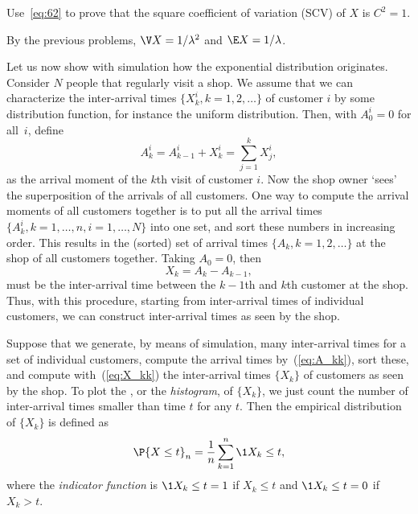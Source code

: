 \begin{exercise}
Use~\eqref{eq:62} to   prove that the square coefficient of variation (SCV) of $X$ is $C^2 =1$.  
\begin{solution}
  By the previous problems, $\V X = 1/\lambda^2$ and $\E X=1/\lambda$.
\end{solution}
\end{exercise}


Let us now show with simulation how the exponential distribution
originates. Consider $N$ people that regularly visit a shop. We assume
that we can characterize the inter-arrival times
$\{X_k^i, k=1,2, \ldots\}$ of customer $i$ by some distribution
function, for instance the uniform distribution. Then, with
$A_{0}^i=0$ for all~$i$, define 
\begin{equation}\label{eq:A_kk}
A_k^i = A_{k-1}^i + X_k^i = \sum_{j=1}^k X_j^i,
\end{equation}
as the arrival moment of the $k$th visit of customer $i$.  Now the
shop owner `sees' the superposition of the arrivals of all
customers. One way to compute the arrival moments of all customers
together is to put all the arrival times
$\{A_k^i, k=1,\ldots,n, i=1,\ldots,N\}$ into one set, and sort these
numbers in increasing order. This results in the (sorted) set of
arrival times $\{A_k, k=1,2,\ldots\}$ at the shop of all customers together. Taking $A_0=0$,  then
\begin{equation}\label{eq:X_kk}
X_k = A_k - A_{k-1},
\end{equation}
must be the inter-arrival time between the $k-1$th and
$k$th customer at the shop.  Thus, with this procedure, starting from inter-arrival times of
individual customers, we can construct inter-arrival times as seen by
the shop.


Suppose that we  generate, by means of simulation, many inter-arrival times for a set of individual customers, compute the arrival times by~(\ref{eq:A_kk}), sort these, and compute with~(\ref{eq:X_kk}) the inter-arrival times $\{X_k\}$ of customers as seen by the shop.  To plot the , or the \emph{histogram}, of $\{X_k\}$, we just  count the
number of inter-arrival times smaller than time $t$ for any $t$.  Then the empirical distribution of $\{X_k\}$ is defined as
\begin{equation*}
  \P{X \leq t}_{n} = \frac1{n}\sum_{k=1}^{n} \1{X_k\leq t},
\end{equation*}
where the \emph{indicator function} is $\1{X_k\leq t}=1$ if $X_k\leq t$ and $\1{X_k\leq t}=0$
if $X_k> t$.  


